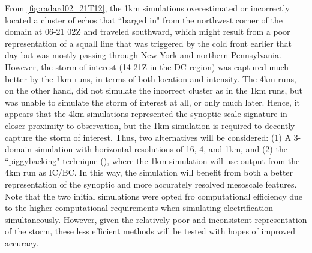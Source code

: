 From \ref{fig:radard02_21T12}, the 1km simulations overestimated or incorrectly located a cluster of echos that ``barged in" from the northwest corner of the domain at 06-21 02Z and traveled southward, which might result from a poor representation of a squall line that was triggered by the cold front earlier that day but was mostly passing through New York and northern Pennsylvania. However, the storm of interest (14-21Z in the DC region) was captured much better by the 1km runs, in terms of both location and intensity. The 4km runs, on the other hand, did not simulate the incorrect cluster as in the 1km runs, but was unable to simulate the storm of interest at all, or only much later. Hence, it appears that the 4km simulations represented the synoptic scale signature in closer proximity to observation, but the 1km simulation is required to decently capture the storm of interest. Thus, two alternatives will be considered: (1) A 3-domain simulation with horizontal resolutions of 16, 4, and 1km, and (2) the ``piggybacking" technique (\cite{grabowski2019separating}), where the 1km simulation will use output from the 4km run as IC/BC. In this way, the simulation will benefit from both a better representation of the synoptic and more accurately resolved mesoscale features. Note that the two initial simulations were opted fro computational efficiency due to the higher computational requirements when simulating electrification simultaneously. However, given the relatively poor and inconsistent representation of the storm, these less efficient methods will be tested with hopes of improved accuracy.